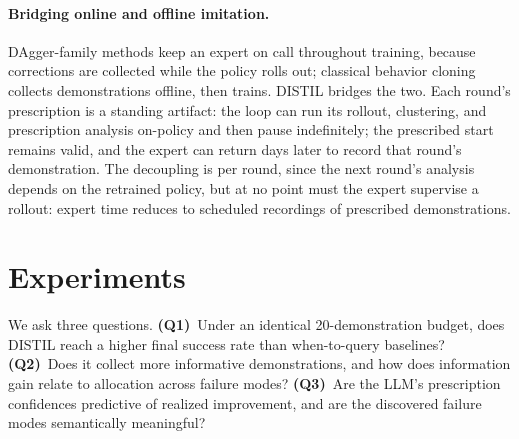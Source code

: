 \documentclass[letterpaper]{article} %
\begin{document}
\paragraph{Bridging online and offline imitation.}
DAgger-family methods keep an expert on call throughout training, because
corrections are collected while the policy rolls out; classical behavior
cloning collects demonstrations offline, then trains. DISTIL bridges the
two.
Each round's prescription is a standing artifact: the loop can run its
rollout, clustering, and prescription analysis on-policy and then pause
indefinitely; the prescribed start remains valid, and the expert can
return days later to record that round's demonstration. The decoupling is per round, since the next round's
analysis depends on the retrained policy, but at no point must the expert
supervise a rollout: expert time reduces to scheduled recordings of
prescribed demonstrations.

\section{Experiments}
\label{sec:experiments}

We ask three questions. \textbf{(Q1)}~Under an identical 20-demonstration
budget, does DISTIL reach a higher final success rate than when-to-query
baselines? \textbf{(Q2)}~Does it collect more informative demonstrations,
and how does information gain relate to allocation across failure modes?
\textbf{(Q3)}~Are the LLM's prescription confidences predictive of realized
improvement, and are the discovered failure modes semantically meaningful?
\end{document}
